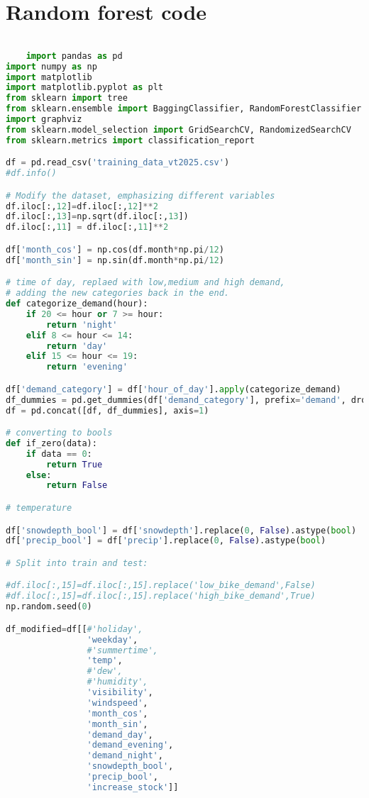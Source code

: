 \section*{Random forest code}
\begin{lstlisting}[language = Python]

    import pandas as pd
import numpy as np
import matplotlib
import matplotlib.pyplot as plt
from sklearn import tree
from sklearn.ensemble import BaggingClassifier, RandomForestClassifier
import graphviz
from sklearn.model_selection import GridSearchCV, RandomizedSearchCV
from sklearn.metrics import classification_report

df = pd.read_csv('training_data_vt2025.csv')
#df.info()

# Modify the dataset, emphasizing different variables
df.iloc[:,12]=df.iloc[:,12]**2
df.iloc[:,13]=np.sqrt(df.iloc[:,13])
df.iloc[:,11] = df.iloc[:,11]**2

df['month_cos'] = np.cos(df.month*np.pi/12)
df['month_sin'] = np.sin(df.month*np.pi/12)

# time of day, replaed with low,medium and high demand, 
# adding the new categories back in the end.
def categorize_demand(hour):
    if 20 <= hour or 7 >= hour:
        return 'night'
    elif 8 <= hour <= 14:
        return 'day'
    elif 15 <= hour <= 19:
        return 'evening'

df['demand_category'] = df['hour_of_day'].apply(categorize_demand)
df_dummies = pd.get_dummies(df['demand_category'], prefix='demand', drop_first=False)
df = pd.concat([df, df_dummies], axis=1)

# converting to bools
def if_zero(data):
    if data == 0:
        return True
    else:
        return False

# temperature

df['snowdepth_bool'] = df['snowdepth'].replace(0, False).astype(bool)
df['precip_bool'] = df['precip'].replace(0, False).astype(bool)

# Split into train and test:

#df.iloc[:,15]=df.iloc[:,15].replace('low_bike_demand',False)
#df.iloc[:,15]=df.iloc[:,15].replace('high_bike_demand',True)
np.random.seed(0)

df_modified=df[[#'holiday',
                'weekday',
                #'summertime',
                'temp',
                #'dew',
                #'humidity',
                'visibility',
                'windspeed',
                'month_cos',
                'month_sin',
                'demand_day',
                'demand_evening',
                'demand_night',
                'snowdepth_bool',
                'precip_bool',
                'increase_stock']]


\end{lstlisting}

